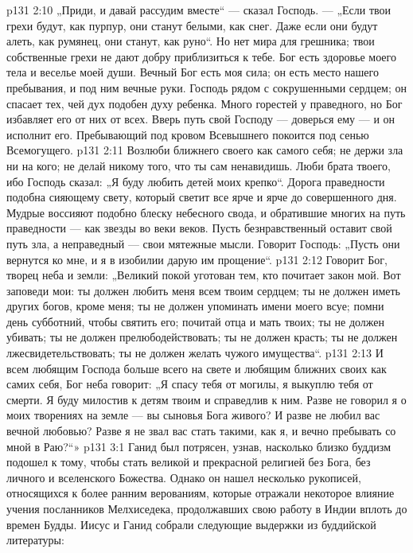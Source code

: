 \vs p131 2:10 „Приди, и давай рассудим вместе“ --- сказал Господь. --- „Если твои грехи будут, как пурпур, они станут белыми, как снег. Даже если они будут алеть, как румянец, они станут, как руно“. Но нет мира для грешника; твои собственные грехи не дают добру приблизиться к тебе. Бог есть здоровье моего тела и веселье моей души. Вечный Бог есть моя сила; он есть место нашего пребывания, и под ним вечные руки. Господь рядом с сокрушенными сердцем; он спасает тех, чей дух подобен духу ребенка. Много горестей у праведного, но Бог избавляет его от них от всех. Вверь путь свой Господу --- доверься ему --- и он исполнит его. Пребывающий под кровом Всевышнего покоится под сенью Всемогущего.
\vs p131 2:11 Возлюби ближнего своего как самого себя; не держи зла ни на кого; не делай никому того, что ты сам ненавидишь. Люби брата твоего, ибо Господь сказал: „Я буду любить детей моих крепко“. Дорога праведности подобна сияющему свету, который светит все ярче и ярче до совершенного дня. Мудрые воссияют подобно блеску небесного свода, и обратившие многих на путь праведности --- как звезды во веки веков. Пусть безнравственный оставит свой путь зла, а неправедный --- свои мятежные мысли. Говорит Господь: „Пусть они вернутся ко мне, и я в изобилии дарую им прощение“.
\vs p131 2:12 Говорит Бог, творец неба и земли: „Великий покой уготован тем, кто почитает закон мой. Вот заповеди мои: ты должен любить меня всем твоим сердцем; ты не должен иметь других богов, кроме меня; ты не должен упоминать имени моего всуе; помни день субботний, чтобы святить его; почитай отца и мать твоих; ты не должен убивать; ты не должен прелюбодействовать; ты не должен красть; ты не должен лжесвидетельствовать; ты не должен желать чужого имущества“.
\vs p131 2:13 И всем любящим Господа больше всего на свете и любящим ближних своих как самих себя, Бог неба говорит: „Я спасу тебя от могилы, я выкуплю тебя от смерти. Я буду милостив к детям твоим и справедлив к ним. Разве не говорил я о моих творениях на земле --- вы сыновья Бога живого? И разве не любил вас вечной любовью? Разве я не звал вас стать такими, как я, и вечно пребывать со мной в Раю?“»
\vs p131 3:1 Ганид был потрясен, узнав, насколько близко буддизм подошел к тому, чтобы стать великой и прекрасной религией без Бога, без личного и вселенского Божества. Однако он нашел несколько рукописей, относящихся к более ранним верованиям, которые отражали некоторое влияние учения посланников Мелхиседека, продолжавших свою работу в Индии вплоть до времен Будды. Иисус и Ганид собрали следующие выдержки из буддийской литературы:
